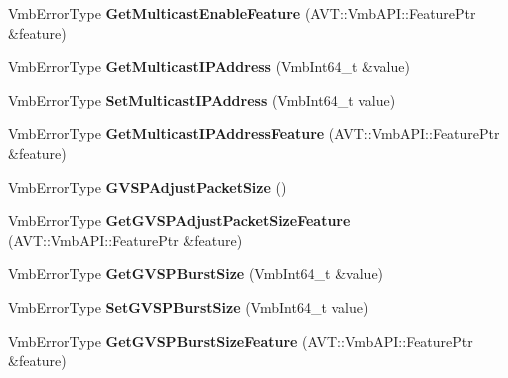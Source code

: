 \begin{DoxyCompactItemize}
\item 
\hypertarget{classMakoCamera_a54467b3aecbb15fb976260d7937292ff}{Vmb\-Error\-Type {\bfseries Get\-Multicast\-Enable\-Feature} (A\-V\-T\-::\-Vmb\-A\-P\-I\-::\-Feature\-Ptr \&feature)}\label{classMakoCamera_a54467b3aecbb15fb976260d7937292ff}

\item 
\hypertarget{classMakoCamera_ab77bf7c7f3a47b74dae08dc363fc3a9a}{Vmb\-Error\-Type {\bfseries Get\-Multicast\-I\-P\-Address} (Vmb\-Int64\-\_\-t \&value)}\label{classMakoCamera_ab77bf7c7f3a47b74dae08dc363fc3a9a}

\item 
\hypertarget{classMakoCamera_abc5ab18c8c21c0e63d899bc2d9e057d3}{Vmb\-Error\-Type {\bfseries Set\-Multicast\-I\-P\-Address} (Vmb\-Int64\-\_\-t value)}\label{classMakoCamera_abc5ab18c8c21c0e63d899bc2d9e057d3}

\item 
\hypertarget{classMakoCamera_a253de45097af01d7001749c8d13fc65c}{Vmb\-Error\-Type {\bfseries Get\-Multicast\-I\-P\-Address\-Feature} (A\-V\-T\-::\-Vmb\-A\-P\-I\-::\-Feature\-Ptr \&feature)}\label{classMakoCamera_a253de45097af01d7001749c8d13fc65c}

\item 
\hypertarget{classMakoCamera_a5563d7babc16c35237c16794de5acbfd}{Vmb\-Error\-Type {\bfseries G\-V\-S\-P\-Adjust\-Packet\-Size} ()}\label{classMakoCamera_a5563d7babc16c35237c16794de5acbfd}

\item 
\hypertarget{classMakoCamera_abe9909763667cff463254da941a68012}{Vmb\-Error\-Type {\bfseries Get\-G\-V\-S\-P\-Adjust\-Packet\-Size\-Feature} (A\-V\-T\-::\-Vmb\-A\-P\-I\-::\-Feature\-Ptr \&feature)}\label{classMakoCamera_abe9909763667cff463254da941a68012}

\item 
\hypertarget{classMakoCamera_a4ffaf9747cf8fafc130d6ff6626a214e}{Vmb\-Error\-Type {\bfseries Get\-G\-V\-S\-P\-Burst\-Size} (Vmb\-Int64\-\_\-t \&value)}\label{classMakoCamera_a4ffaf9747cf8fafc130d6ff6626a214e}

\item 
\hypertarget{classMakoCamera_a85a9de65db13c3b914c64d960c8168f7}{Vmb\-Error\-Type {\bfseries Set\-G\-V\-S\-P\-Burst\-Size} (Vmb\-Int64\-\_\-t value)}\label{classMakoCamera_a85a9de65db13c3b914c64d960c8168f7}

\item 
\hypertarget{classMakoCamera_ad7be97084fb6e8171effd97a0454f9ce}{Vmb\-Error\-Type {\bfseries Get\-G\-V\-S\-P\-Burst\-Size\-Feature} (A\-V\-T\-::\-Vmb\-A\-P\-I\-::\-Feature\-Ptr \&feature)}\label{classMakoCamera_ad7be97084fb6e8171effd97a0454f9ce}


\end{DoxyCompactItemize}
